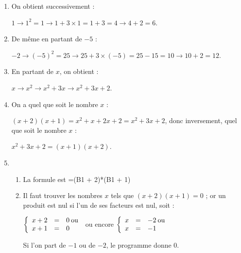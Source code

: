 \documentclass[10pt]{article}
\begin{document}
\setlength\parindent{0mm}
\pagestyle{fancy}
\thispagestyle{empty}
    
    
    




\medskip

\begin{enumerate}
\item On obtient successivement :

$1 \to 1^2 = 1 \to 1 + 3 \times 1 = 1 + 3 = 4 \to 4 + 2 = 6$. 
\item De même en partant de $- 5$ : 

$- 2 \to (- 5)^2 = 25 \to 25 + 3 \times (- 5) = 25 - 15 = 10 \to 10 + 2 = 12$.
\item En partant de $x$, on obtient :

$x \to x^2 \to x^2 + 3x \to x^2 + 3x + 2$.
\item On a quel que soit le nombre $x$ : 

$(x + 2)(x + 1) = x^2 + x + 2x + 2 = x^2 + 3x + 2$, donc inversement, quel que soit le nombre $x$ :

$x^2 + 3x + 2 = (x + 1)(x + 2)$.
\item
	\begin{enumerate}
		\item La formule est =(B1 + 2)*(B1 + 1)
		\item Il faut trouver les nombres $x$ tels que $(x + 2)(x + 1) = 0$ ; or un produit est nul si l'un de ses facteurs est nul, soit :
		
		$\left\{\begin{array}{l c l}
		x + 2&=&0 \:\text{ou}\\
		x + 1&=&0
		\end{array}\right.$ ou encore $\left\{\begin{array}{l c l}
		x &=&- 2\:\text{ou}\\
		x &=&- 1
		\end{array}\right.$
		
Si l'on part de $- 1$ ou de $- 2$, le programme donne $0$.
	\end{enumerate}
\end{enumerate}

\vspace{0,5cm}
\end{document}
